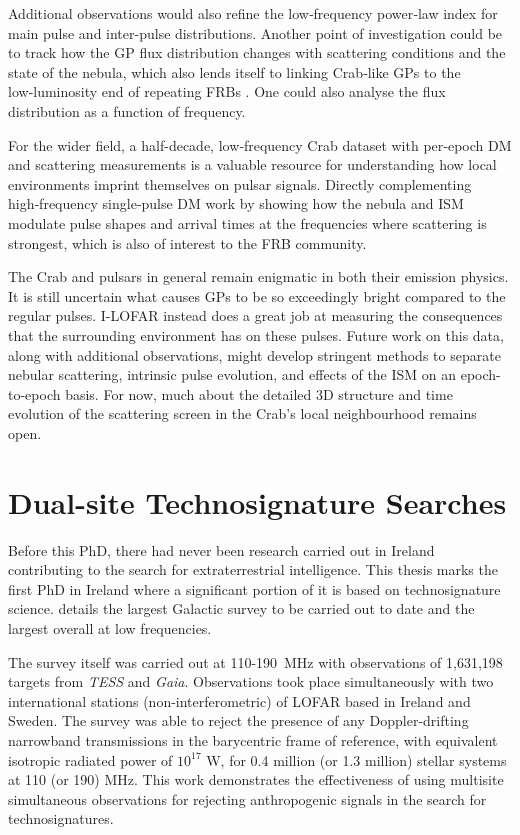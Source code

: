 Additional observations would also refine the low‑frequency power‑law index for main pulse and inter-pulse distributions. Another point of investigation could be to track how the GP flux distribution changes with scattering conditions and the state of the nebula, which also lends itself to linking Crab‑like GPs to the low‑luminosity end of repeating FRBs \citep{sokolowski_100_2025}. One could also analyse the flux distribution as a function of frequency.  

For the wider field, a half-decade, low‑frequency Crab dataset with per‑epoch DM and scattering measurements is a valuable resource for understanding how local environments imprint themselves on pulsar signals. Directly complementing high‑frequency single‑pulse DM work by showing how the nebula and ISM modulate pulse shapes and arrival times at the frequencies where scattering is strongest, which is also of interest to the FRB community. 

The Crab and pulsars in general remain enigmatic in both their emission physics. It is still uncertain what causes GPs to be so exceedingly bright compared to the regular pulses. I-LOFAR instead does a great job at measuring the consequences that the surrounding environment has on these pulses. Future work on this data, along with additional observations, might develop stringent methods to separate nebular scattering, intrinsic pulse evolution, and effects of the ISM on an epoch-to-epoch basis. For now, much about the detailed 3D structure and time evolution of the scattering screen in the Crab's local neighbourhood remains open.

\section{Dual-site Technosignature Searches}

Before this PhD, there had never been research carried out in Ireland contributing to the search for extraterrestrial intelligence. This thesis marks the first PhD in Ireland where a significant portion of it is based on technosignature science.  details the largest Galactic survey to be carried out to date and the largest overall at low frequencies. 

The survey itself was carried out at 110-190~MHz with observations of 1,631,198 targets from \textit{TESS} and \textit{Gaia}. Observations took place simultaneously with two international stations (non-interferometric) of LOFAR based in Ireland and Sweden. The survey was able to reject the presence of any Doppler-drifting narrowband transmissions in the barycentric frame of reference, with equivalent isotropic radiated power of $10^{17}$ W, for 0.4 million (or 1.3 million) stellar systems at 110 (or 190) MHz. This work demonstrates the effectiveness of using multisite simultaneous observations for rejecting anthropogenic signals in the search for technosignatures. 

